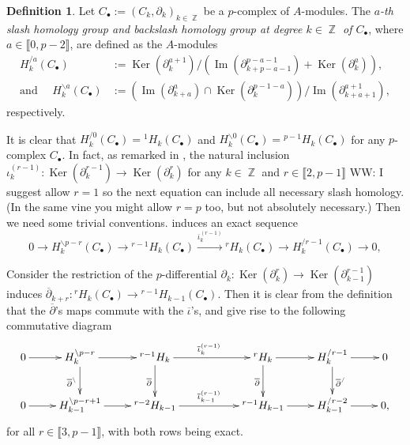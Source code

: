 \documentclass[a4paper]{amsart}
\numberwithin{equation}{subsection}
\theoremstyle{definition}
\newtheorem{definition}[theorem]{Definition}
\DeclareMathOperator{\Z}{\mathbb{Z}}
\newcommand{\interval}[1]{\llbracket #1 \rrbracket}
\newcommand{\comm}[1]{{\color{red}#1}}
\DeclareMathOperator{\Ker}{\mathrm{Ker}}
\DeclareMathOperator{\Image}{\mathrm{Im}}
\numberwithin{equation}{subsection}
\begin{document}
\begin{definition}
Let $C_\bullet:=(C_k,\partial_k)_{k\in\Z}$ be a $p$-complex of $A$-modules.
The \emph{$a$-th slash homology group and backslash homology group at degree $k\in\Z$ of $C_\bullet$}, where $a\in\interval{0,p-2}$, are defined as the $A$-modules
\begin{align*}
H_k^{/a}(C_\bullet) &:= \Ker(\partial^{a+1}_k)/(\Image(\partial^{p-a-1}_{k+p-a-1})+\Ker(\partial^a_k)),\\
\text{and }\quad H_k^{\backslash a}(C_\bullet) &:= (\Image(\partial^a_{k+a})\cap \Ker(\partial^{p-1-a}_k))/\Image(\partial^{a+1}_{k+a+1}),
\end{align*}
respectively.
\end{definition}

It is clear that $H_k^{/0}(C_\bullet)={}^1H_k(C_\bullet)$ and $H_k^{\backslash 0}(C_\bullet)={}^{p-1}H_k(C_\bullet)$ for any $p$-complex $C_\bullet$.  In fact, as remarked in \cite{KhQi}, the natural inclusion $\iota_{k}^{(r-1)}:\Ker(\partial_k^{r-1})\to \Ker(\partial_k^r)$ for any $k\in\Z$ and $r\in \interval{2,p-1}$ \comm{WW: I suggest allow $r=1$ so the next equation can include all necessary slash homology. (In the same vine you might allow $r=p$ too, but not absolutely necessary.) Then we need some trivial conventions.} induces an exact sequence
\begin{equation}\label{eq:4termseq}
0 \to H_k^{\backslash p-r}(C_\bullet) \to {}^{r-1}H_k(C_\bullet) \xrightarrow{\overline{\iota}_{k}^{(r-1)}} {}^rH_k(C_\bullet) \to H_k^{/r-1}(C_\bullet) \to 0,
\end{equation}

Consider the restriction of the $p$-differential $\partial_k:\Ker(\partial_k^{r})\to \Ker(\partial_{k-1}^{r-1})$ induces $\overline{\partial}_{k+r}: {}^rH_k(C_\bullet)\to {}^{r-1}H_{k-1}(C_\bullet)$.
Then it is clear from the definition that the $\overline{\partial}$'s maps commute with the $\overline{\iota}$'s, and give rise to the following commutative diagram 
\begin{equation}\label{eq:4termseq2}
\vcenter{\xymatrix{ 0 \ar[r]& 
H_k^{\backslash p-r} \ar[r]\ar[d]_{\overline{\partial}^{\backslash}}& 
{}^{r-1}H_k \ar[rr]^{\overline{\iota}_{k}^{(r-1)}} \ar[d]_{\overline{\partial}} &&
{}^rH_k \ar[r] \ar[d]_{\overline{\partial}} &
H_k^{/r-1} \ar[r]\ar[d]^{\overline{\partial}^{\slash}} & 0 \\ 
0 \ar[r]& H_{k-1}^{\backslash p-r+1} \ar[r]& {{}^{r-2}H_{k-1}}  \ar[rr]^{\overline{\iota}_{k-1}^{(r-1)}} &&{}^{r-1}H_{k-1} \ar[r]& H_{k-1}^{/r-2} \ar[r]& 0,
}}
\end{equation}
for all $r\in\interval{3, p-1}$, with both rows being exact.
\end{document}
